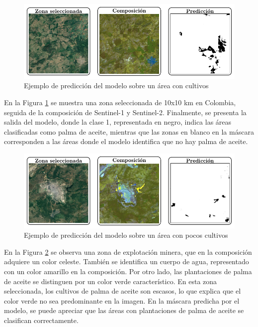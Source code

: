 \begin{figure}[t]
 \centering
 \includegraphics[width=\textwidth]{example_selected_zone}
 \caption{Ejemplo de predicción del modelo sobre un área con cultivos}
 \label{fig:example_selected_zone}
\end{figure}

En la Figura \ref{fig:example_selected_zone} se muestra una zona seleccionada de 10x10 km en Colombia, seguida de la composición de Sentinel-1 y Sentinel-2. Finalmente, se presenta la salida del modelo, donde la clase 1, representada en negro, indica las áreas clasificadas como palma de aceite, mientras que las zonas en blanco en la máscara corresponden a las áreas donde el modelo identifica que no hay palma de aceite.

\begin{figure}[t]
 \centering
 \includegraphics[width=\textwidth]{example_few_crops}
 \caption{Ejemplo de predicción del modelo sobre un área con pocos cultivos}
 \label{fig:example_few_crops}
\end{figure}

En la Figura \ref{fig:example_few_crops} se observa una zona de explotación minera, que en la composición adquiere un color celeste. También se identifica un cuerpo de agua, representado con un color amarillo en la composición. Por otro lado, las plantaciones de palma de aceite se distinguen por un color verde característico. En esta zona seleccionada, los cultivos de palma de aceite son escasos, lo que explica que el color verde no sea predominante en la imagen. En la máscara predicha por el modelo, se puede apreciar que las áreas con plantaciones de palma de aceite se clasifican correctamente.


